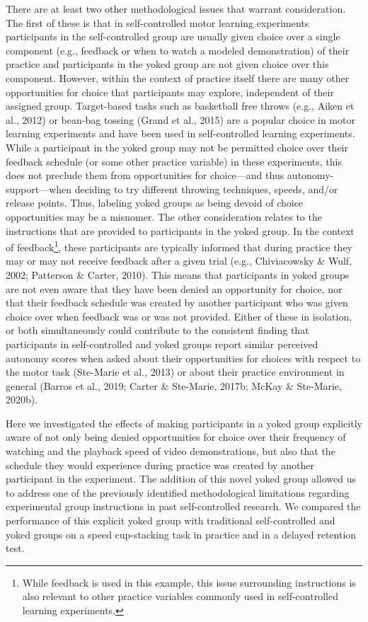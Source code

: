 \documentclass[
  english,
  man,floatsintext]{apa7}
\begin{document}
There are at least two other methodological issues that warrant consideration. The first of these is that in self-controlled motor learning experiments participants in the self-controlled group are usually given choice over a single component (e.g., feedback or when to watch a modeled demonstration) of their practice and participants in the yoked group are not given choice over this component. However, within the context of practice itself there are many other opportunities for choice that participants may explore, independent of their assigned group. Target-based tasks such as basketball free throws (e.g., Aiken et al., 2012) or bean-bag tossing (Grand et al., 2015) are a popular choice in motor learning experiments and have been used in self-controlled learning experiments. While a participant in the yoked group may not be permitted choice over their feedback schedule (or some other practice variable) in these experiments, this does not preclude them from opportunities for choice---and thus autonomy-support---when deciding to try different throwing techniques, speeds, and/or release points. Thus, labeling yoked groups as being devoid of choice opportunities may be a misnomer. The other consideration relates to the instructions that are provided to participants in the yoked group. In the context of feedback\footnote{While feedback is used in this example, this issue surrounding instructions is also relevant to other practice variables commonly used in self-controlled learning experiments.}, these participants are typically informed that during practice they may or may not receive feedback after a given trial (e.g., Chiviacowsky \& Wulf, 2002; Patterson \& Carter, 2010). This means that participants in yoked groups are not even aware that they have been denied an opportunity for choice, nor that their feedback schedule was created by another participant who was given choice over when feedback was or was not provided. Either of these in isolation, or both simultaneously could contribute to the consistent finding that participants in self-controlled and yoked groups report similar perceived autonomy scores when asked about their opportunities for choices with respect to the motor task (Ste-Marie et al., 2013) or about their practice environment in general (Barros et al., 2019; Carter \& Ste-Marie, 2017b; McKay \& Ste-Marie, 2020b).

Here we investigated the effects of making participants in a yoked group explicitly aware of not only being denied opportunities for choice over their frequency of watching and the playback speed of video demonstrations, but also that the schedule they would experience during practice was created by another participant in the experiment. The addition of this novel yoked group allowed us to address one of the previously identified methodological limitations regarding experimental group instructions in past self-controlled research. We compared the performance of this explicit yoked group with traditional self-controlled and yoked groups on a speed cup-stacking task in practice and in a delayed retention test.
\end{document}
